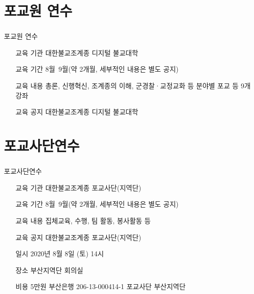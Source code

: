 \documentclass[aspectratio=1610,14pt,xcolor=pdftex,dvipsnames,table,handout]{beamer}
\begin{document}
		\section{ 포교원 연수 }
		\begin{frame} [t,plain]
		\frametitle{}
			\begin{block} { 포교원 연수 }
			\setlength{\leftmargini}{5em}			
			\begin{itemize}
				\item [교육 기관] 대한불교조계종 디지털 불교대학
				\item [교육 기간]8월~9월(약 2개월, 세부적인 내용은 별도 공지)
				\item [교육 내용] 총론, 신행혁신, 조계종의 이해, 군경찰·교정교화 등 분야별 포교 등 9개 강좌
				\item [교육 공지] 대한불교조계종 디지털 불교대학
			\end{itemize}
			\end{block}			

								
		\end{frame}						
	

		\section{ 포교사단연수 }
		\begin{frame} [t,plain]
		\frametitle{ }
			\begin{block} { 포교사단연수 }
			\setlength{\leftmargini}{5em}			
			\begin{itemize}
				\item [교육 기관] 대한불교조계종 포교사단(지역단)
				\item [교육 기간]8월~9월(약 2개월, 세부적인 내용은 별도 공지)
				\item [교육 내용] 집체교육, 수행, 팀 활동, 봉사활동 등
				\item [교육 공지] 대한불교조계종 포교사단(지역단)

				\item [일시]	2020년 8월 8일 (토) 14시
				\item [장소]	부산지역단 회의실
				\item [비용]	5만원
		부산은행
		206-13-000414-1
		포교사단 부산지역단

			\end{itemize}
			\end{block}						
								
		\end{frame}						
\end{document}

